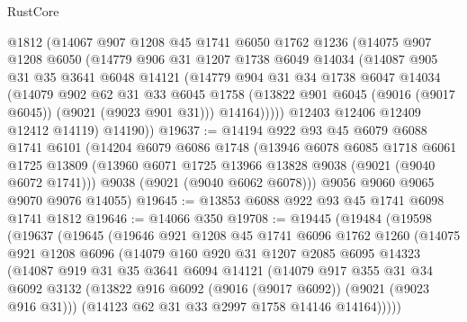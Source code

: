 \begin{lexlean}{RustCore}
\begin{coremodule}
        @1812
        (@14067
          @907
          @1208
          @45
          @1741
          @6050
          @1762
          @1236
          (@14075
            @907
            @1208
            @6050
            (@14779
              @906
              @31
              @1207
              @1738
              @6049
              @14034
              (@14087
                @905
                @31
                @35
                @3641
                @6048
                @14121
                (@14779
                  @904
                  @31
                  @34
                  @1738
                  @6047
                  @14034
                  (@14079
                    @902
                    @62
                    @31
                    @33
                    @6045
                    @1758
                    (@13822 @901 @6045 (@9016 (@9017 @6045)) (@9021 (@9023 @901 @31)))
                    @14164)))))
          @12403
          @12406
          @12409
          @12412
          @14119)
        @14190))
@19637 := @14194
    @922
    @93
    @45
    @6079
    @6088
    @1741
    @6101
    (@14204
      @6079
      @6086
      @1748
      (@13946
        @6078
        @6085
        @1718
        @6061
        @1725
        @13809
        (@13960 @6071 @1725 @13966 @13828 @9038 (@9021 (@9040 @6072 @1741)))
        @9038
        (@9021 (@9040 @6062 @6078)))
      @9056
      @9060
      @9065
      @9070
      @9076
      @14055)
@19645 := @13853 @6088 @922 @93 @45 @1741 @6098 @1741 @1812
@19646 := @14066 @350
@19708 := @19445
    (@19484
      (@19598
        (@19637
          (@19645
            (@19646
              @921
              @1208
              @45
              @1741
              @6096
              @1762
              @1260
              (@14075
                @921
                @1208
                @6096
                (@14079
                  @160
                  @920
                  @31
                  @1207
                  @2085
                  @6095
                  @14323
                  (@14087
                    @919
                    @31
                    @35
                    @3641
                    @6094
                    @14121
                    (@14079
                      @917
                      @355
                      @31
                      @34
                      @6092
                      @3132
                      (@13822 @916 @6092 (@9016 (@9017 @6092)) (@9021 (@9023 @916 @31)))
                      (@14123 @62 @31 @33 @2997 @1758 @14146 @14164)))))

\end{coremodule}
\end{lexlean}
